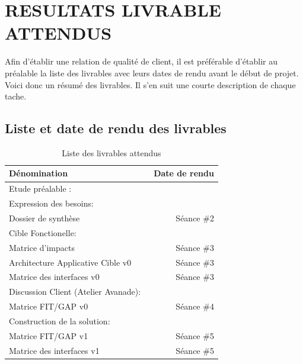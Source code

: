 \documentclass[]{scrartcl}
\begin{document}
\newpage
\section{RESULTATS LIVRABLE ATTENDUS}
Afin d'établir une relation de qualité de client, il est préférable d'établir au préalable la liste des livrables avec leurs dates de rendu avant le début de projet. Voici donc un résumé des livrables. Il s'en suit une courte description de chaque tache. 
\subsection{Liste et date de rendu des livrables}
\begin{table}[h!]\centering
    \caption{Liste des livrables attendus}
    \begin{tabular}{l r}%
        \toprule
        \textbf{Dénomination} & \ \textbf{Date de rendu} \\%
        \midrule%
       Etude préalable :  & \\ \midrule
       \hspace{0.33cm} Expression des besoins:  & \\ 
       \hspace{0.66cm} Dossier de synthèse & Séance \#2\\
         \hspace{0.33cm}  Cible Fonctionelle: & \\
                \hspace{0.66cm} Matrice d'impacts & Séance \#3\\ 
       \hspace{0.66cm}  Architecture Applicative Cible v0& Séance \#3\\
       \hspace{0.66cm}  Matrice des interfaces v0 & Séance \#3\\ 
         \hspace{0.33cm}   Discussion Client (Atelier Avanade): & \\
                \hspace{0.66cm}  Matrice FIT/GAP v0& Séance \#4\\
         \hspace{0.33cm}   Construction de la solution: & \\
                \hspace{0.66cm} Matrice FIT/GAP v1& Séance \#5\\ 
       \hspace{0.66cm} Matrice des interfaces v1& Séance \#5\\

\end{tabular}
\end{table}
\end{document}
